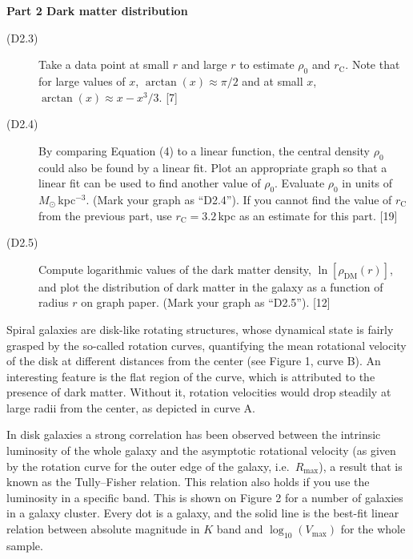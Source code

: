 \medskip
\textbf{Part 2 Dark matter distribution}

\begin{description}
\item[(D2.3)] Take a data point at small $r$ and large $r$ to estimate
  $\rho_0$ and $r_{\mathrm{C}}$. Note that for large values of $x$,
  $\arctan(x) \approx \pi/2$ and at small $x$,
  $\arctan(x) \approx x - x^3/3$. \hfill[7]
\item[(D2.4)] By comparing Equation (4) to a linear function, the central
  density $\rho_0$ could also be found by a linear fit. Plot an appropriate
  graph so that a linear fit can be used to find another value of $\rho_0$.
  Evaluate $\rho_0$ in units of $M_\odot$\,kpc$^{-3}$. (Mark your graph as
  ``D2.4''). If you cannot find the value of $r_{\mathrm{C}}$ from the
  previous part, use $r_{\mathrm{C}} = 3.2$\,kpc as an estimate for this
  part. \hfill[19]
\item[(D2.5)] Compute logarithmic values of the dark matter density,
  $\ln[\rho_{\mathrm{DM}}(r)]$, and plot the distribution of dark matter in
  the galaxy as a function of radius $r$ on graph paper. (Mark your graph as
  ``D2.5''). \hfill[12]
\end{description}

Spiral galaxies are disk-like rotating structures, whose dynamical state is
fairly grasped by the so-called rotation curves, quantifying the mean
rotational velocity of the disk at different distances from the center (see
Figure 1, curve B). An interesting feature is the flat region of the curve,
which is attributed to the presence of dark matter. Without it, rotation
velocities would drop steadily at large radii from the center, as depicted in
curve A.


In disk galaxies a strong correlation has been observed between the intrinsic
luminosity of the whole galaxy and the asymptotic rotational velocity (as
given by the rotation curve for the outer edge of the galaxy, i.e.\
$R_{\max}$), a result that is known as the Tully--Fisher relation. This
relation also holds if you use the luminosity in a specific band. This is
shown on Figure 2 for a number of galaxies in a galaxy cluster. Every dot is a
galaxy, and the solid line is the best-fit linear relation between absolute
magnitude in $K$ band and $\log_{10}(V_{\max})$ for the whole sample.

